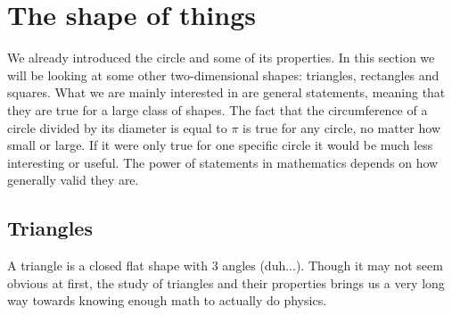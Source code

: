 \section{The shape of things}

\noindent We already introduced the circle and some of its properties. In this section we will be looking at some other two-dimensional shapes: triangles, rectangles and squares. What we are mainly interested in are general statements, meaning that they are true for a large class of shapes. The fact that the circumference of a circle divided by its diameter is equal to $\pi$ is true for any circle, no matter how small or large. If it were only true for one specific circle it would be much less interesting or useful. The power of statements in mathematics depends on how generally valid they are.

\subsection{Triangles}
\label{Intro_Triangles}

\noindent A triangle is a closed flat shape with 3 angles (duh...). Though it may not seem obvious at first, the study of triangles and their properties brings us a very long way towards knowing enough math to actually do physics.\\

